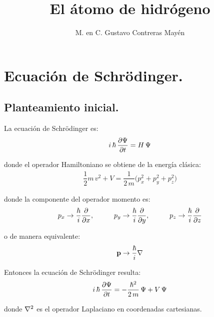 
\title{El átomo de hidrógeno} \vspace{-3ex}
\author{M. en C. Gustavo Contreras Mayén}
\date{ }
\newcommand{\Cancel}[2][black]{{\color{#1}\cancel{\color{black}#2}}}

\vspace{-4cm}
\maketitle
\fontsize{14}{14}\selectfont
\tableofcontents
\newpage

\section{Ecuación de Schrödinger.}
\subsection{Planteamiento inicial.}

La ecuación de Schrödinger es:
\begin{align}
i \, \hbar \, \pdv{\Psi}{t} = H \, \Psi
\label{eq:ecuacion_04_01}
\end{align}

donde el operador Hamiltoniano se obtiene de la energía clásica:
\begin{align*}
\dfrac{1}{2} m \, v^{2} + V = \dfrac{1}{2 \, m} \big( p_{x}^{2} + p_{y}^{2} + p_{z}^{2} \big)
\end{align*}

donde la componente del operador momento es:
\begin{align}
p_{x} \to \dfrac{\hbar}{i} \pdv{x}, \hspace{1cm} p_{y} \to \dfrac{\hbar}{i} \pdv{y}, \hspace{1cm} p_{z} \to \dfrac{\hbar}{i} \pdv{z}
\label{eq:ecuacion_04_02}
\end{align}

o de manera equivalente:
\begin{align}
\vb{p} \to \dfrac{\hbar}{i} \nabla
\end{align}

Entonces la ecuación de Schrödinger resulta:
\begin{align}
i \, \hbar \, \pdv{\Psi}{t} = -\dfrac{\hbar^{2}}{2 \, m} \, \Psi + V \, \Psi
\label{eq:ecuacion_04_04}    
\end{align}

donde $\laplacian$ es el operador Laplaciano en coordenadas cartesianas.

